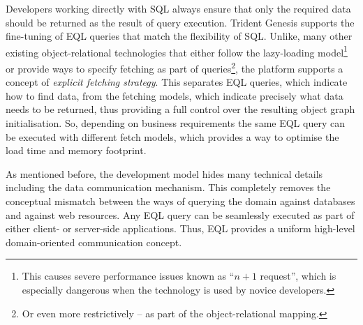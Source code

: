   Developers working directly with SQL always ensure that only the required data should be returned as the result of query execution.  
  Trident Genesis supports the fine-tuning of EQL queries that match the flexibility of SQL.
  Unlike, many other existing object-relational technologies that either follow the lazy-loading model\footnote{
  This causes severe performance issues known as ``$n+1$ request'', which is especially dangerous when the technology is used by novice developers.}
  or provide ways to specify fetching as part of queries\footnote{Or even more restrictively -- as part of the object-relational mapping.}, the platform supports a concept of \emph{explicit fetching strategy}.
  This separates EQL queries, which indicate how to find data, from the fetching models, which indicate precisely what data needs to be returned, thus providing a full control over the resulting object graph initialisation.
  So, depending on business requirements the same EQL query can be executed with different fetch models, which provides a way to optimise the load time and memory footprint.

  As mentioned before, the development model hides many technical details including the data communication mechanism.
  This completely removes the conceptual mismatch between the ways of querying the domain against databases and against web resources.
  Any EQL query can be seamlessly executed as part of either client- or server-side applications.
  Thus, EQL provides a uniform high-level domain-oriented communication concept.